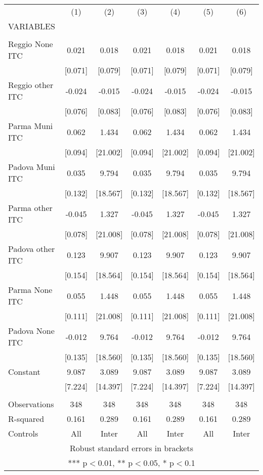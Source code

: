 \begin{tabular}{lcccccc} \hline
 & (1) & (2) & (3) & (4) & (5) & (6) \\
VARIABLES &  &  &  &  &  &  \\ \hline
 &  &  &  &  &  &  \\
Reggio None ITC & 0.021 & 0.018 & 0.021 & 0.018 & 0.021 & 0.018 \\
 & [0.071] & [0.079] & [0.071] & [0.079] & [0.071] & [0.079] \\
Reggio other ITC & -0.024 & -0.015 & -0.024 & -0.015 & -0.024 & -0.015 \\
 & [0.076] & [0.083] & [0.076] & [0.083] & [0.076] & [0.083] \\
Parma Muni ITC & 0.062 & 1.434 & 0.062 & 1.434 & 0.062 & 1.434 \\
 & [0.094] & [21.002] & [0.094] & [21.002] & [0.094] & [21.002] \\
Padova Muni ITC & 0.035 & 9.794 & 0.035 & 9.794 & 0.035 & 9.794 \\
 & [0.132] & [18.567] & [0.132] & [18.567] & [0.132] & [18.567] \\
Parma other ITC & -0.045 & 1.327 & -0.045 & 1.327 & -0.045 & 1.327 \\
 & [0.078] & [21.008] & [0.078] & [21.008] & [0.078] & [21.008] \\
Padova other ITC & 0.123 & 9.907 & 0.123 & 9.907 & 0.123 & 9.907 \\
 & [0.154] & [18.564] & [0.154] & [18.564] & [0.154] & [18.564] \\
Parma None ITC & 0.055 & 1.448 & 0.055 & 1.448 & 0.055 & 1.448 \\
 & [0.111] & [21.008] & [0.111] & [21.008] & [0.111] & [21.008] \\
Padova None ITC & -0.012 & 9.764 & -0.012 & 9.764 & -0.012 & 9.764 \\
 & [0.135] & [18.560] & [0.135] & [18.560] & [0.135] & [18.560] \\
Constant & 9.087 & 3.089 & 9.087 & 3.089 & 9.087 & 3.089 \\
 & [7.224] & [14.397] & [7.224] & [14.397] & [7.224] & [14.397] \\
 &  &  &  &  &  &  \\
Observations & 348 & 348 & 348 & 348 & 348 & 348 \\
R-squared & 0.161 & 0.289 & 0.161 & 0.289 & 0.161 & 0.289 \\
 Controls & All & Inter & All & Inter & All & Inter \\ \hline
\multicolumn{7}{c}{ Robust standard errors in brackets} \\
\multicolumn{7}{c}{ *** p$<$0.01, ** p$<$0.05, * p$<$0.1} \\
\end{tabular}
